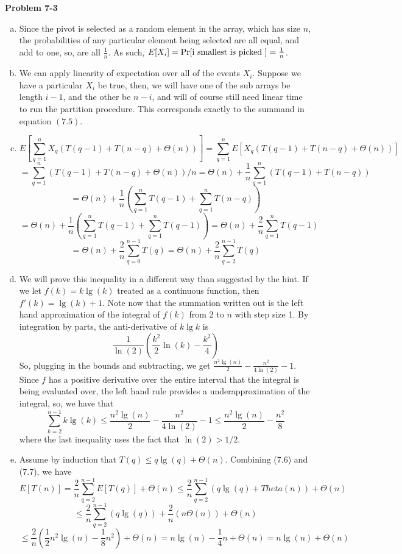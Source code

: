 \documentclass{article}
\begin{document}
\noindent\textbf{Problem 7-3}\\
\begin{enumerate}[a.]
\item
Since the pivot is selected as a random element in the array, which has size $n$, the probabilities of any particular element being selected are all equal, and add to one, so, are all $\frac{1}{n}$. As such, $E[X_i] = \Pr[\hbox{i smallest is picked }] = \frac{1}{n}$.

\item
We can apply linearity of expectation over all of the events $X_i$. Suppose we have a particular $X_i$ be true, then, we will have one of the sub arrays be length $i-1$, and the other be $n-i$, and will of course still need linear time to run the partition procedure. This corresponds exactly to the summand in equation $(7.5)$.

\item
\[
E\left[\sum_{q=1}^{n}X_q(T(q-1) + T(n-q) + \Theta(n))\right] = \sum_{q=1}^{n} E\left[X_q(T(q-1) + T(n-q) + \Theta(n))\right] \]\[= \sum_{q=1}^{n}(T(q-1) + T(n-q) + \Theta(n))/n = \Theta(n) +  \frac{1}{n} \sum_{q=1}^{n}(T(q-1) + T(n-q) ) \]\[= \Theta(n) + \frac{1}{n} \left(  \sum_{q=1}^{n}T(q-1) +  \sum_{q=1}^{n}T(n-q)\right) \]\[= \Theta(n) + \frac{1}{n} \left(  \sum_{q=1}^{n}T(q-1) +  \sum_{q=1}^{n}T(q-1)\right) = \Theta(n) + \frac{2}{n} \sum_{q=1}^{n}T(q-1) \]\[= \Theta(n) + \frac{2}{n} \sum_{q=0}^{n-1}T(q) = \Theta(n) + \frac{2}{n} \sum_{q=2}^{n-1}T(q)\]

\item

We will prove this inequality in a different way than suggested by the hint. If we let $f(k) = k\lg(k)$ treated as a continuous function, then $f'(k) = \lg(k) + 1$. Note now that the summation written out is the left hand approximation of the integral of $f(k)$ from 2 to $n$ with step size 1. By integration by parts, the anti-derivative of $k\lg k$ is 
\[
\frac{1}{\ln(2)}\left(\frac{k^2}{2}\ln(k) - \frac{k^2}{4} \right)
\]
So, plugging in the bounds and subtracting, we get $\frac{n^2 \lg(n)}{2} - \frac{n^2}{4\ln(2)} - 1$. Since $f$ has a positive derivative over the entire interval that the integral is being evaluated over, the left hand rule provides a underapproximation of the integral, so, we have that 
\[
\sum_{k=2}^{n-1} k\lg(k) \le \frac{n^2 \lg(n)}{2} - \frac{n^2}{4\ln(2)} - 1 \le \frac{n^2 \lg(n)}{2} - \frac{n^2}{8} 
\]
where the last inequality uses the fact that $\ln(2)>1/2$.

\item
Assume by induction that $T(q) \le q\lg(q)+\Theta(n)$. Combining (7.6) and (7.7), we have
\[
E[T(n)] = \frac{2}{n} \sum_{q=2}^{n-1} E[T(q)] + \Theta(n) \le \frac{2}{n} \sum_{q=2}^{n-1} (q\lg(q) + Theta(n)) + \Theta(n) \]\[\le \frac{2}{n} \sum_{q=2}^{n-1} (q\lg(q)) + \frac{2}{n}(n\Theta(n)) + \Theta(n)\]\[   \le \frac{2}{n} (\frac{1}{2} n^2 \lg(n) -\frac{1}{8} n^2) + \Theta(n) = n\lg(n) - \frac{1}{4} n+ \Theta(n) = n\lg(n) +\Theta(n)
\]

\end{enumerate}
\end{document}
